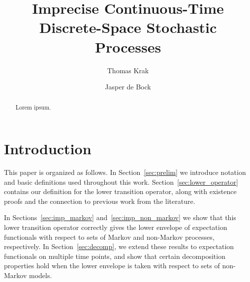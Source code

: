 \documentclass[10pt]{paper}
\title{Imprecise Continuous-Time Discrete-Space Stochastic Processes}
\author{Thomas Krak \and Jasper de Bock}
\begin{document}


\date{}
\maketitle

\begin{abstract}
Lorem ipsum.
\end{abstract}

\section{Introduction}\label{sec:introduction}

This paper is organized as follows. In Section~\ref{sec:prelim} we introduce notation and basic definitions used throughout this work. Section~\ref{sec:lower_operator} contains our definition for the lower transition operator, along with existence proofs and the connection to previous work from the literature. 

In Sections~\ref{sec:imp_markov} and~\ref{sec:imp_non_markov} we show that this lower transition operator correctly gives the lower envelope of expectation functionals with respect to sets of Markov and non-Markov processes, respectively. In Section~\ref{sec:decomp}, we extend these results to expectation functionals on multiple time points, and show that certain decomposition properties hold when the lower envelope is taken with respect to sets of non-Markov models. 
\end{document}
